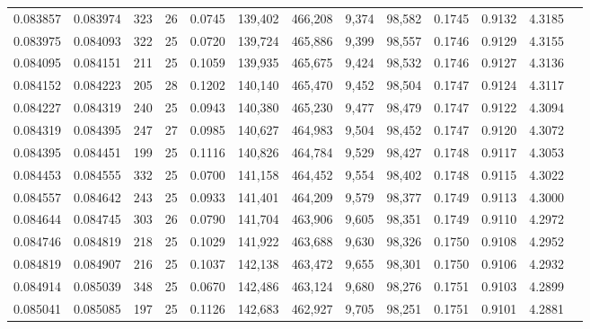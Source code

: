 \begin{tabular}{rrrrrrrrrrrrr}
0.083857 & 0.083974 & 323 &  26 &                                     0.0745 & 139,402 & 466,208 &   9,374 &  98,582 & 0.1745 & 0.9132 & 4.3185 \\
0.083975 & 0.084093 & 322 &  25 &                                     0.0720 & 139,724 & 465,886 &   9,399 &  98,557 & 0.1746 & 0.9129 & 4.3155 \\
0.084095 & 0.084151 & 211 &  25 &                                     0.1059 & 139,935 & 465,675 &   9,424 &  98,532 & 0.1746 & 0.9127 & 4.3136 \\
0.084152 & 0.084223 & 205 &  28 &                                     0.1202 & 140,140 & 465,470 &   9,452 &  98,504 & 0.1747 & 0.9124 & 4.3117 \\
0.084227 & 0.084319 & 240 &  25 &                                     0.0943 & 140,380 & 465,230 &   9,477 &  98,479 & 0.1747 & 0.9122 & 4.3094 \\
0.084319 & 0.084395 & 247 &  27 &                                     0.0985 & 140,627 & 464,983 &   9,504 &  98,452 & 0.1747 & 0.9120 & 4.3072 \\
0.084395 & 0.084451 & 199 &  25 &                                     0.1116 & 140,826 & 464,784 &   9,529 &  98,427 & 0.1748 & 0.9117 & 4.3053 \\
0.084453 & 0.084555 & 332 &  25 &                                     0.0700 & 141,158 & 464,452 &   9,554 &  98,402 & 0.1748 & 0.9115 & 4.3022 \\
0.084557 & 0.084642 & 243 &  25 &                                     0.0933 & 141,401 & 464,209 &   9,579 &  98,377 & 0.1749 & 0.9113 & 4.3000 \\
0.084644 & 0.084745 & 303 &  26 &                                     0.0790 & 141,704 & 463,906 &   9,605 &  98,351 & 0.1749 & 0.9110 & 4.2972 \\
0.084746 & 0.084819 & 218 &  25 &                                     0.1029 & 141,922 & 463,688 &   9,630 &  98,326 & 0.1750 & 0.9108 & 4.2952 \\
0.084819 & 0.084907 & 216 &  25 &                                     0.1037 & 142,138 & 463,472 &   9,655 &  98,301 & 0.1750 & 0.9106 & 4.2932 \\
0.084914 & 0.085039 & 348 &  25 &                                     0.0670 & 142,486 & 463,124 &   9,680 &  98,276 & 0.1751 & 0.9103 & 4.2899 \\
0.085041 & 0.085085 & 197 &  25 &                                     0.1126 & 142,683 & 462,927 &   9,705 &  98,251 & 0.1751 & 0.9101 & 4.2881 \\

\end{tabular}
